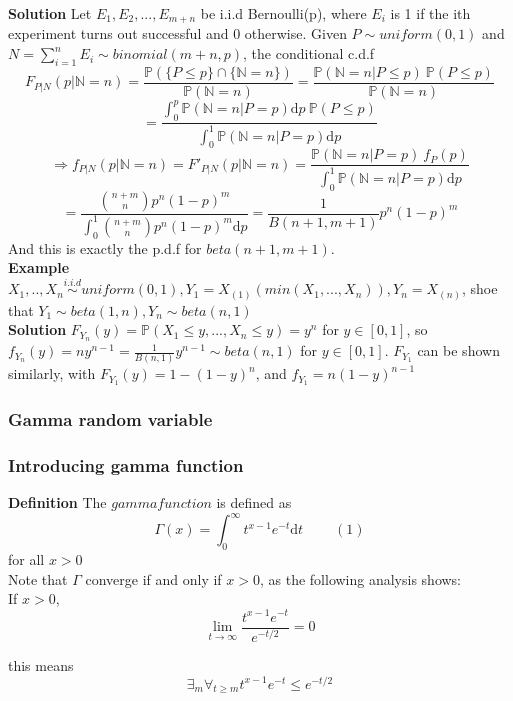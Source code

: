 \documentclass[a4paper,12pt]{article}
\begin{document}
\textbf{Solution}
Let $E_1, E_2, ..., E_{m+n}$ be i.i.d Bernoulli(p), where $E_i$ is 1 if the ith experiment turns out successful and 0 otherwise. Given $P \sim uniform(0, 1)$ and $N = \sum_{i=1}^n E_i \sim binomial(m+n, p)$, the conditional c.d.f 
$$F_{P|N}(p|\mathbb{N}=n) = \frac{\mathbb{P}( \{P \leq p\} \cap \{\mathbb{N} = n\} )}{\mathbb{P}(\mathbb{N} = n)} = \frac{\mathbb{P}( \mathbb{N} = n | P \leq p )\  \mathbb{P}( P \leq p )}{\mathbb{P}(\mathbb{N} = n)} $$
$$= \frac{\int_0^p \mathbb{P} (\mathbb{N} = n | P=p) \mathrm{d}p \  \mathbb{P}( P \leq p )}{\int_0^1 \mathbb{P} (\mathbb{N} = n | P=p) \mathrm{d}p }$$
$$\Rightarrow f_{P|N}(p|\mathbb{N}=n) = F'_{P|N}(p|\mathbb{N}=n) =   \frac{\mathbb{P} (\mathbb{N} = n | P=p)\ f_P(p)}{\int_0^1 \mathbb{P} (\mathbb{N} = n | P=p) \mathrm{d}p }$$
$$= \frac{ {n+m \choose n}p^n(1-p)^m }{\int_0^1{ n+m \choose n}p^n(1-p)^m\mathrm{d}p} = \frac{1}{B(n+1, m+1)} p^n (1-p)^m$$
And this is exactly the p.d.f for $beta(n+1, m+1)$.\\

\textbf{Example} $X_1, .., X_n \overset{i.i.d}{\sim} uniform(0, 1), Y_1 = X_{(1)} (min( X_1, ..., X_n )), Y_n = X_{(n)}$, shoe that $Y_1 \sim beta(1, n), Y_n \sim beta(n, 1)$\\

\textbf{Solution}
$F_{Y_n}(y) = \mathbb{P}(X_1 \leq y, ..., X_n \leq y) = y^n $ for $y \in [0, 1]$, so $f_{Y_n}(y) = ny^{n-1} = \frac{1}{B(n, 1)}y^{n-1} \sim beta(n, 1)$ for $y \in [0, 1]$. $F_{Y_1}$ can be shown similarly, with $F_{Y_1}(y) = 1-(1-y)^n$, and $f_{Y_1} = n(1-y)^{n-1}$

\subsubsection{Gamma random variable}
\subsubsection*{Introducing gamma function}
\textbf{Definition} The $gamma function$ is defined as
{\center}$$\Gamma(x) = \int_0^{\infty} t^{x-1}e^{-t} \mathrm{d}t\ \ \ \ \ \ \ \ \ \ (1)$${\center} 
for all $x > 0$ \\

Note that $\Gamma$ converge if and only if $x>0$, as the following analysis shows:\\

If $x>0$,  $$\lim_{t\rightarrow\infty} \frac{t^{x-1}e^{-t}}{e^{-t/2}} = 0$$

this means $$ \exists_m \forall_{t\geq m}  t^{x-1}e^{-t} \leq {e^{-t/2}} $$
\end{document}
